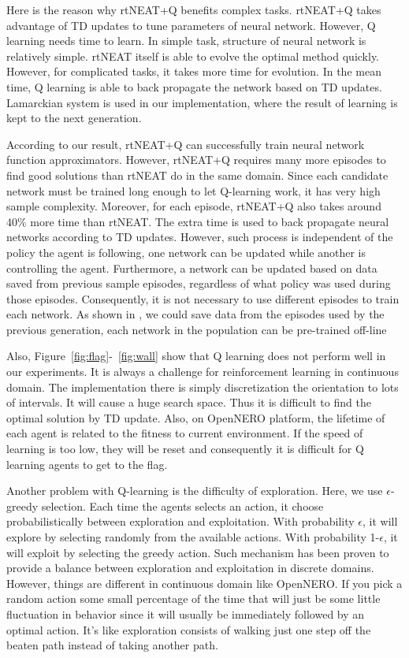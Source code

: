 \documentclass[letterpaper]{article}
\begin{document}
Here is the reason why rtNEAT+Q benefits complex tasks. rtNEAT+Q takes advantage of TD updates to tune parameters of neural network. However, Q learning needs time to learn. In simple task, structure of neural network is relatively simple. rtNEAT itself is able to evolve the optimal method quickly. However, for complicated tasks, it takes more time for evolution. In the mean time, Q learning is able to back propagate the network based on TD updates. Lamarckian system is used in our implementation, where the result of learning is kept to the next generation. 

According to our result, rtNEAT+Q can successfully train neural network function approximators. However, rtNEAT+Q requires many more episodes to find good solutions than rtNEAT do in the same domain. Since each candidate network must be trained long enough to let Q-learning work, it has very high sample complexity. Moreover, for each episode, rtNEAT+Q also takes around 40\% more time than rtNEAT. The extra time is used to back propagate neural networks according to TD updates. However, such process is independent of the policy the agent is following, one network can be updated while another is controlling the agent. Furthermore, a network can be updated based on data saved from previous sample episodes, regardless of what policy was used during those episodes. Consequently,
it is not necessary to use different episodes to train each network. As shown in \cite{whiteson2006sample}, we could save data from the episodes used by the previous generation, each network in the population can be pre-trained off-line

Also, Figure~\ref{fig:flag}-~\ref{fig:wall} show that Q learning does not perform well in our experiments. It is always a challenge for reinforcement learning in continuous domain. The implementation there is simply discretization the orientation to lots of intervals. It will cause a huge search space. Thus it is difficult to find the optimal solution by TD update. Also, on OpenNERO platform, the lifetime of each agent is related to the fitness to current environment. If the speed of learning is too low, they will be reset and consequently it is difficult for Q learning agents to get to the flag. 

Another problem with Q-learning is the difficulty of exploration. Here, we use $\epsilon$-greedy selection. Each time the agents selects an action, it choose probabilistically between exploration and exploitation. With probability $\epsilon$, it will explore by selecting randomly from the available actions. With probability 1-$\epsilon$, it will exploit by selecting the greedy action. Such mechanism has been proven to provide a balance between exploration and exploitation in discrete domains. However, things are different in continuous domain like OpenNERO. If you pick a random action some small percentage of the time that will just be some little fluctuation in behavior since it will usually be immediately followed by an optimal action. It's like exploration consists of walking just one step off the beaten path instead of taking another path. 
\end{document}
